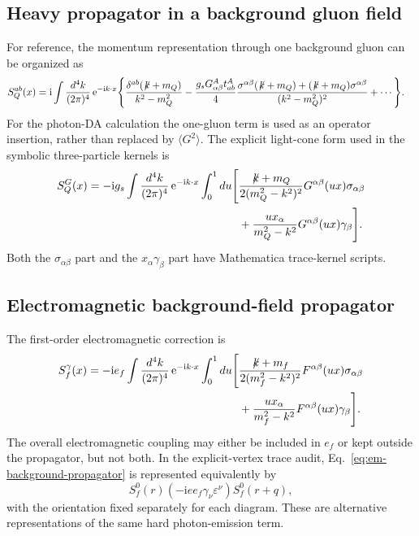 \documentclass[11pt]{article}
\newcommand{\ii}{\mathrm{i}}
\newcommand{\ee}{\mathrm{e}}
\begin{document}
\subsection{Heavy propagator in a background gluon field}

For reference, the momentum representation through one background gluon can
be organized as
\begin{align}
  S_Q^{ab}(x)
  =\ii\int\frac{d^4k}{(2\pi)^4}\,\ee^{-\ii k\cdot x}
  \Bigg\{&
  \frac{\delta^{ab}(\not\!k+m_Q)}{k^2-m_Q^2}
  -\frac{g_sG^A_{\alpha\beta}t^A_{ab}}{4}
  \frac{
    \sigma^{\alpha\beta}(\not\!k+m_Q)
    +(\not\!k+m_Q)\sigma^{\alpha\beta}}
  {(k^2-m_Q^2)^2}
  +\cdots\Bigg\}.
  \label{eq:heavy-full-propagator}
\end{align}
For the photon-DA calculation the one-gluon term is used as an operator
insertion, rather than replaced by $\langle G^2\rangle$.  The explicit
light-cone form used in the symbolic three-particle kernels is
\begin{align}
  S_Q^G(x)
  =-\ii g_s\int\frac{d^4k}{(2\pi)^4}\,\ee^{-\ii k\cdot x}
  \int_0^1du\Bigg[
  &\frac{\not\!k+m_Q}{2(m_Q^2-k^2)^2}
    G^{\alpha\beta}(ux)\sigma_{\alpha\beta}
  \nonumber\\
  &+\frac{ux_\alpha}{m_Q^2-k^2}
    G^{\alpha\beta}(ux)\gamma_\beta
  \Bigg].
  \label{eq:gluon-background-propagator}
\end{align}
Both the $\sigma_{\alpha\beta}$ part and the
$x_\alpha\gamma_\beta$ part have Mathematica trace-kernel scripts.

\subsection{Electromagnetic background-field propagator}

The first-order electromagnetic correction is
\begin{align}
  S_f^\gamma(x)
  =-\ii e_f\int\frac{d^4k}{(2\pi)^4}\,\ee^{-\ii k\cdot x}
  \int_0^1du\Bigg[
  &\frac{\not\!k+m_f}{2(m_f^2-k^2)^2}
    F^{\alpha\beta}(ux)\sigma_{\alpha\beta}
  \nonumber\\
  &+\frac{ux_\alpha}{m_f^2-k^2}
    F^{\alpha\beta}(ux)\gamma_\beta
  \Bigg].
  \label{eq:em-background-propagator}
\end{align}
The overall electromagnetic coupling may either be included in $e_f$ or kept
outside the propagator, but not both.  In the explicit-vertex trace audit,
Eq.~\eqref{eq:em-background-propagator} is represented equivalently by
\begin{equation}
  S_f^0(r)(-\ii e e_f\gamma_\nu\varepsilon^\nu)S_f^0(r+q),
\end{equation}
with the orientation fixed separately for each diagram.  These are alternative
representations of the same hard photon-emission term.
\end{document}
